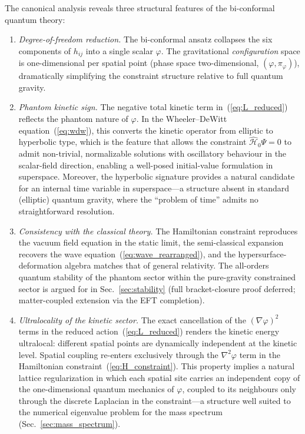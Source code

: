 \documentclass[aps,prd,onecolumn,superscriptaddress,nofootinbib,showpacs,12pt,notitlepage]{revtex4-2}
\begin{document}
The canonical analysis reveals three structural features
of the bi-conformal quantum theory:
\begin{enumerate}
\item \textit{Degree-of-freedom reduction.}  The
  bi-conformal ansatz collapses the six components of
  $h_{ij}$ into a single scalar $\varphi$.  The
  gravitational \emph{configuration} space is one-dimensional
  per spatial point (phase space two-dimensional,
  $(\varphi,\pi_\varphi)$), dramatically simplifying the
  constraint structure relative to full quantum gravity.

\item \textit{Phantom kinetic sign.}  The negative total
  kinetic term in~(\ref{eq:L_reduced}) reflects the phantom
  nature of $\varphi$.  In the Wheeler--DeWitt
  equation~(\ref{eq:wdw}), this converts the kinetic
  operator from elliptic to hyperbolic type, which is the
  feature that allows the constraint
  $\hat{\mathcal{H}}_0\Psi = 0$ to admit non-trivial,
  normalizable solutions with oscillatory behaviour
  in the scalar-field direction, enabling a well-posed
  initial-value formulation in superspace.  Moreover, the
  hyperbolic signature provides a natural candidate for an
  internal time variable in superspace---a structure absent
  in standard (elliptic) quantum gravity, where the
  ``problem of time'' admits no straightforward resolution.

\item \textit{Consistency with the classical theory.}
  The Hamiltonian constraint reproduces the vacuum field
  equation in the static limit, the semi-classical
  expansion recovers the wave
  equation~(\ref{eq:wave_rearranged}), and the
  hypersurface-deformation algebra matches that of general
  relativity.  The all-orders quantum stability of the
  phantom sector within the pure-gravity constrained sector
  is argued for in Sec.~\ref{sec:stability} (full
  bracket-closure proof deferred; matter-coupled extension
  via the EFT completion).

\item \textit{Ultralocality of the kinetic sector.}  The
  exact cancellation of the $(\nabla\varphi)^2$ terms in
  the reduced action~(\ref{eq:L_reduced}) renders the
  kinetic energy ultralocal: different spatial points are
  dynamically independent at the kinetic level.  Spatial
  coupling re-enters exclusively through the
  $\nabla^2\varphi$ term in the Hamiltonian
  constraint~(\ref{eq:H_constraint}).  This property
  implies a natural lattice regularization in which each
  spatial site carries an independent copy of the
  one-dimensional quantum mechanics of $\varphi$, coupled
  to its neighbours only through the discrete Laplacian
  in the constraint---a structure well suited to the
  numerical eigenvalue problem for the mass spectrum
  (Sec.~\ref{sec:mass_spectrum}).
\end{enumerate}
\end{document}
